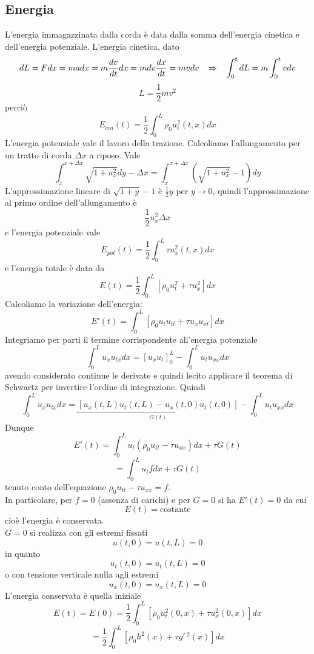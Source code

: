 \subsection{Energia}
L'energia immagazzinata dalla corda \`e data dalla somma dell'energia cinetica
e dell'energia potenziale. L'energia cinetica, dato
\[
	dL=Fdx=madx=m\frac{dv}{dt}dx=mdv\frac{dx}{dt}=mvdv
	\;\;\; \Rightarrow \;\;\;
	\int_0^t dL= m \int_0^t vdv
\]
\[
	L=\frac{1}{2}mv^2
\]
perci\`o
\[
	E_{cin}(t)= \frac{1}{2}\int_0^L \rho_0 u^2_t(t,x)dx
\]
L'energia potenziale vale il lavoro della trazione.
Calcoliamo l'allungamento per un tratto di corda $\Delta x$ a riposo. Vale
\[
	\int_x^{x + \Delta x} \sqrt{1+ u^2_x} dy - \Delta x=
	\int_x^{x + \Delta x} \left( \sqrt{1+ u^2_x}-1 \right) dy
\]
L'approssimazione lineare di $\sqrt{1+y}-1$ \`e $\frac{1}{2}y$ per $y \to 0$,
quindi l'approssimazione al primo ordine dell'allungamento \`e
\[
	\frac{1}{2} u^2_x \Delta x
\]
e l'energia potenziale vale
\[
	E_{pot}(t)= \frac{1}{2} \int_0^L \tau u^2_x (t,x)dx
\]
e l'energia totale \`e data da
\[
	E(t)= \frac{1}{2}\int_0^L \left[
	\rho_0 u^2_t + \tau u_x^2
	\right] dx
\]
Calcoliamo la variazione dell'energia:
\[
	E'(t)= \int_0^L \left[
	\rho_0 u_t u_{tt} + \tau u_x u_{xt}
	\right] dx
\]
Integriamo per parti il termine corrispondente all'energia potenziale
\[
	\int_0^L u_x u_{tx}dx=
	\left[ u_x u_t \right]_0^L -
	\int_0^L u_t u_{xx} dx
\]
avendo considerato continue le derivate e quindi lecito applicare il
teorema di Schwartz per invertire l'ordine di integrazione. Quindi
\[
	\int_0^L u_x u_{tx}dx=
	\underbracket{\left[ u_x(t,L) u_t(t,L) -  u_x(t,0) u_t(t,0) \right]}_{
	G(t)} -
	\int_0^L u_t u_{xx} dx
\]
Dunque
\[
	E'(t)= \int_0^L u_t (\rho_0 u_{tt} - \tau u_{xx})dx + \tau G(t)
\]
\[
	= \int_0^L u_t f dx + \tau G(t)
\]
tenuto conto dell'equazione $\rho_0 u_{tt} - \tau u_{xx}= f$.\\
In particolare, per $f=0$ (assenza di carichi) e per $G=0$ si ha $E'(t)=0$
da cui
\[
	E(t)= \text{costante}
\]
cio\`e l'energia \`e conservata.\\
$G=0$ si realizza con gli estremi fissati
\[
	u(t,0)=u(t,L)=0
\]
in quanto
\[
	u_t(t,0)=u_t(t,L)=0
\]
o con tensione verticale nulla agli estremi
\[
	u_x(t,0)=u_x(t,L)=0
\]
L'energia conservata \`e quella iniziale
\[
	E(t)=E(0)=\frac{1}{2}\int_0^L
	\left[
	\rho_0 u_t^2 (0,x) + \tau u^2_x (0,x)
	\right]dx
\]
\[
	=\frac{1}{2}\int_0^L
	\left[
	\rho_0 h^2(x) + \tau g'\,^2(x)
	\right]dx
\]
